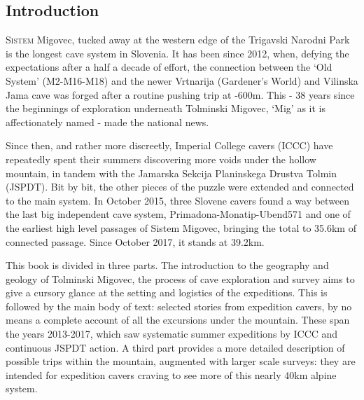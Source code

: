 \begin{tcolorbox} %
\vspace{60pt}
	\part{Introduction}
	\lettrine{S}{istem} Migovec, tucked away at the western edge of the Trigavski Narodni Park is the longest cave system in Slovenia. It has been since 2012, when, defying the expectations after a half a decade of effort, the connection between the ‘Old System’ (M2-M16-M18) and the newer Vrtnarija (Gardener’s World) and Vilinska Jama cave was forged after a routine pushing trip at -600m. This - 38 years since the beginnings of exploration underneath Tolminski Migovec, ‘Mig’ as it is affectionately named - made the national news. 

Since then, and rather more discreetly,  Imperial College cavers (ICCC) have repeatedly spent their summers discovering more voids under the hollow mountain, in tandem with the Jamarska Sekcija Planinskega Drustva Tolmin (JSPDT). Bit by bit, the other pieces of the puzzle were extended and connected to the main system. In October 2015, three Slovene cavers found a way between the last big independent cave system, Primadona-Monatip-Ubend571 and one of the earliest high level passages of Sistem Migovec, bringing the total to 35.6km of connected passage. Since October 2017, it stands at 39.2km.

This book is divided in three parts. The introduction to the geography and geology of Tolminski Migovec, the process of cave exploration and survey aims to give a cursory glance at the setting and logistics of the expeditions. This is followed by the main body of text: selected stories from expedition cavers, by no means a complete account of all the excursions under the mountain. These span the years 2013-2017, which saw systematic summer expeditions by ICCC and continuous JSPDT action. A third part provides a more detailed description of possible trips within the mountain, augmented with larger scale surveys: they are intended for expedition cavers craving to see more of this nearly 40km alpine system. 
\end{tcolorbox}
